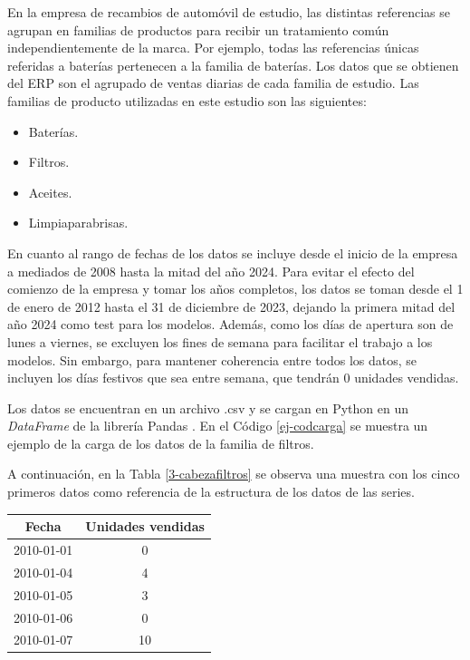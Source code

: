En la empresa de recambios de automóvil de estudio, las distintas referencias se agrupan en familias de productos para recibir un tratamiento común independientemente de la marca. Por ejemplo, todas las referencias únicas referidas a baterías pertenecen a la familia de baterías. Los datos que se obtienen del ERP son el agrupado de ventas diarias de cada familia de estudio. Las familias de producto utilizadas en este estudio son las siguientes:

\begin{itemize}
    \item Baterías.
    \item Filtros.
    \item Aceites.
    \item Limpiaparabrisas.
\end{itemize} 

En cuanto al rango de fechas de los datos se incluye desde el inicio de la empresa a mediados de 2008 hasta la mitad del año 2024. Para evitar el efecto del comienzo de la empresa y tomar los años completos, los datos se toman desde el 1 de enero de 2012 hasta el 31 de diciembre de 2023, dejando la primera mitad del año 2024 como test para los modelos. Además, como los días de apertura son de lunes a viernes, se excluyen los fines de semana para facilitar el trabajo a los modelos. Sin embargo, para mantener coherencia entre todos los datos, se incluyen los días festivos que sea entre semana, que tendrán 0 unidades vendidas.

Los datos se encuentran en un archivo .csv y se cargan en Python en un \textit{DataFrame} de la librería Pandas \cite{pandas}. En el Código \ref*{ej-codcarga} se muestra un ejemplo de la carga de los datos de la familia de filtros. 



A continuación, en la Tabla \ref*{3-cabezafiltros} se observa una muestra con los cinco primeros datos como referencia de la estructura de los datos de las series.

\begin{table}[H]
	{\begin{tabular}{|c|c|}
		\hline
        \textbf{Fecha} & \textbf{Unidades vendidas} \\
        \hline
        2010-01-01 & 0 \\
        \hline
        2010-01-04 & 4 \\
        \hline
        2010-01-05 & 3 \\
        \hline
        2010-01-06 & 0 \\
        \hline
        2010-01-07 & 10 \\
        \hline
	\end{tabular}}
\end{table}


